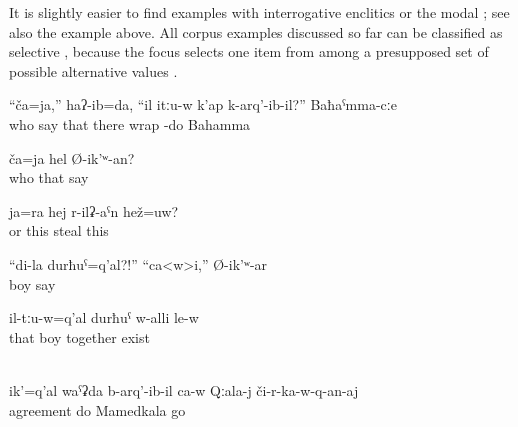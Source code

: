 It is slightly easier to find examples with interrogative enclitics  or the modal   ; see also the example  above. All corpus examples discussed so far can be classified as selective , because the focus selects one item from among a presupposed set of possible alternative values \citep[62]{Diketal1981}.
%
\begin{exe}
	\ex	\label{ex:I asked Bahama, who is it that is wrapped there}
	\gll	``ča=ja,''	haʔ-ib=da,	``il	itːu-w	k'ap	k-arq'-ib-il?'' Baħaˁmma-cːe\\
		who	say	that	there wrap	-do Bahamma\\
	\glt	{}

	\ex	\label{ex:Who is it who said this}
	\gll	ča=ja	hel	Ø-ik'ʷ-an?\\
		who	that	say\\
	\glt	{}

	\ex	\label{ex:‎‎Or is this her who is stealing}
	\gll	ja=ra	hej	r-ilʡ-aˁn	hež=uw?\\
		or	this	steal	this\\
	\glt	{}

	\ex	\label{ex:‎‎‎This is my son?!‎ ‎‎Yes, he says}
	\gll	``di-la	durħuˁ=q'al?!''	``ca<w>i,''	Ø-ik'ʷ-ar\\
			boy		say\\
	\glt	{}

	\ex	\label{ex:Here (i.e. on this picture) is it that the boy is together with them@26b}
	\gll	il-tːu-w=q'al	durħuˁ	w-alli	le-w\\
		that	boy	together	exist\\
	\glt	{}

	\\\label{ex:‎It was him himself who had agreed to get off (the car) in Kala (place name)}%
	\gll	ik'=q'al	waˁʡda	b-arq'-ib-il	ca-w	Qːala-j	či-r-ka-w-q-an-aj\\
			agreement	do		Mamedkala	go\\
	\glt	{}
\end{exe}

